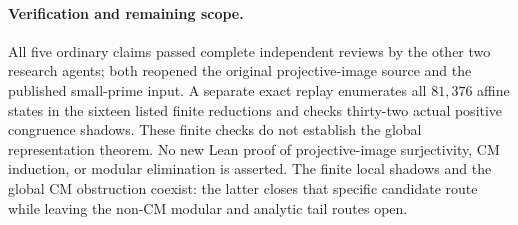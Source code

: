 \paragraph{Verification and remaining scope.}
All five ordinary claims passed complete independent reviews by the
other two research agents; both reopened the original projective-image
source and the published small-prime input. A separate exact replay
enumerates all $81{,}376$ affine states in the sixteen listed finite
reductions and checks thirty-two actual positive congruence shadows.
These finite checks do not establish the global representation theorem.
No new Lean proof of projective-image surjectivity, CM induction, or
modular elimination is asserted. The finite local shadows and the
global CM obstruction coexist: the latter closes that specific
candidate route while leaving the non-CM modular and analytic tail
routes open.
